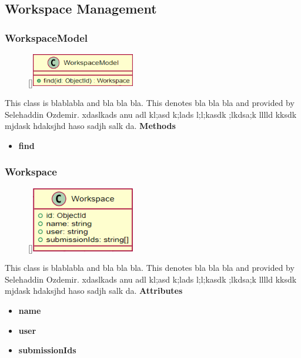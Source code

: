 \subsection{Workspace Management}

\subsubsection{WorkspaceModel}
\begin{figure}
    \raisebox{0pt}[\dimexpr{}\baselineskip\relax]{\includegraphics[width=4.5cm]{classes/workspace-management/1.png}}
\end{figure} 
\par
This class is blablabla and bla bla bla. This denotes bla bla bla and provided by Selehaddin Ozdemir. xdaslkads anu adl kl;asd k;lads l;l;kasdk ;lkdsa;k lllld kksdk mjdask hdaksjhd haso sadjh salk da.
\newline
\newline
\textbf{Methods}
\begin{itemize}
    \item \textbf{find}
\end{itemize}

\subsubsection{Workspace}
\begin{figure}
    \raisebox{0pt}[\dimexpr{}\baselineskip\relax]{\includegraphics[width=4.5cm]{classes/workspace-management/2.png}}
\end{figure} 
\par
This class is blablabla and bla bla bla. This denotes bla bla bla and provided by Selehaddin Ozdemir. xdaslkads anu adl kl;asd k;lads l;l;kasdk ;lkdsa;k lllld kksdk mjdask hdaksjhd haso sadjh salk da.
\newline
\newline
\textbf{Attributes}
\begin{itemize}
    \item \textbf{name}
    \item \textbf{user}
    \item \textbf{submissionIds}
\end{itemize}

